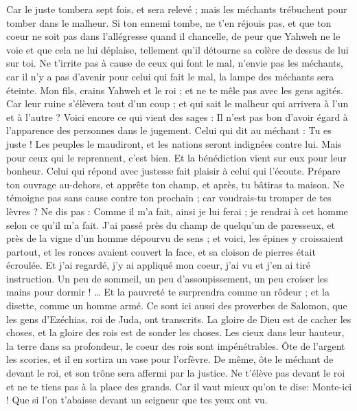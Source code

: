 \begin{multicols}{2}
Car le juste tombera sept fois, et sera relevé ; mais les méchants trébuchent pour tomber dans le malheur.
Si ton ennemi tombe, ne t'en réjouis pas, et que ton coeur ne soit pas dans l’allégresse quand il chancelle,
de peur que Yahweh ne le voie et que cela ne lui déplaise, tellement qu'il détourne sa colère de dessus de lui sur toi.
Ne t’irrite pas à cause de ceux qui font le mal, n'envie pas les méchants,
car il n'y a pas d’avenir pour celui qui fait le mal, la lampe des méchants sera éteinte.
Mon fils, crains Yahweh et le roi ; et ne te mêle pas avec les gens agités.
Car leur ruine s'élèvera tout d'un coup ; et qui sait le malheur qui arrivera à l’un et à l’autre ?
Voici encore ce qui vient des sages : Il n'est pas bon d'avoir égard à l'apparence des personnes dans le jugement.
Celui qui dit au méchant : Tu es juste ! Les peuples le maudiront, et les nations seront indignées contre lui.
Mais pour ceux qui le reprennent, c’est bien. Et la bénédiction vient sur eux pour leur bonheur.
Celui qui répond avec justesse fait plaisir à celui qui l'écoute.
Prépare ton ouvrage au-dehors, et apprête ton champ, et après, tu bâtiras ta maison.
Ne témoigne pas sans cause contre ton prochain ; car voudrais-tu tromper de tes lèvres ?
Ne dis pas : Comme il m'a fait, ainsi je lui ferai ; je rendrai à cet homme selon ce qu'il m'a fait.
J'ai passé près du champ de quelqu’un de paresseux, et près de la vigne d'un homme dépourvu de sens ;
et voici, les épines y croissaient partout, et les ronces avaient couvert la face, et sa cloison de pierres était écroulée.
Et j’ai regardé, j’y ai appliqué mon coeur, j’ai vu et j’en ai tiré instruction.
Un peu de sommeil, un peu d’assoupissement, un peu croiser les mains pour dormir ! …
Et la pauvreté te surprendra comme un rôdeur ; et la disette, comme un homme armé.
\VerseOne{}Ce sont ici aussi des proverbes de Salomon, que les gens d'Ezéchias, roi de Juda, ont transcrits.
La gloire de Dieu est de cacher les choses, et la gloire des rois est de sonder les choses.
Les cieux dans leur hauteur, la terre dans sa profondeur, le coeur des rois sont impénétrables.
Ôte de l'argent les scories, et il en sortira un vase pour l’orfèvre.
 De même, ôte le méchant de devant le roi, et son trône sera affermi par la justice.
Ne t’élève pas devant le roi et ne te tiens pas à la place des grands.
Car il vaut mieux qu'on te dise: Monte-ici ! Que si l’on t'abaisse devant un seigneur que tes yeux ont vu.

\end{multicols}
